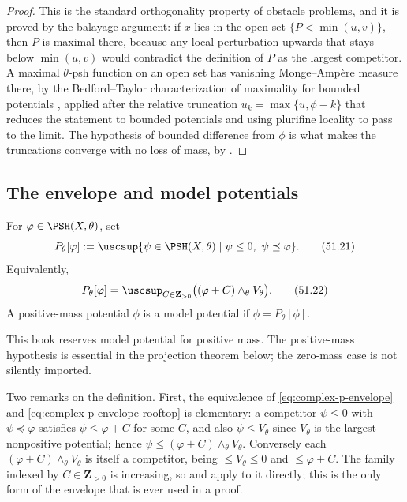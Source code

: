 \begin{proof}
This is the standard orthogonality property of obstacle problems, and it
is proved by the balayage argument: if \(x\) lies in the open set
\(\{P<\min(u,v)\}\), then \(P\) is maximal there, because any local
perturbation upwards that stays below \(\min(u,v)\) would contradict the
definition of \(P\) as the largest competitor.  A maximal
\(\theta\)-psh function on an open set has vanishing Monge--Amp\`ere
measure there, by the Bedford--Taylor characterization of maximality for
bounded potentials \cite{BT82}, applied after the relative truncation
\(u_k=\max\{u,\phi-k\}\) that reduces the statement to bounded
potentials and using plurifine locality to pass to the limit.  The
hypothesis of bounded difference from \(\phi\) is what makes the
truncations converge with no loss of mass, by
.
\end{proof}

\subsection{The envelope and model potentials}
\label{sec:ch51-p-envelope-def}

\begin{definition}
\label{def:complex-p-envelope}
For \(\varphi\in\PSH(X,\theta)\), set
\[
 P_\theta[\varphi]
 :=\uscsup\{\psi\in\PSH(X,\theta)\mid
              \psi\leq0,\ \psi\preceq\varphi\}.
\tag{51.21}\label{eq:complex-p-envelope}
\]
Equivalently,
\[
 P_\theta[\varphi]
 =\uscsup_{C\in\mathbf Z_{>0}}
       \bigl((\varphi+C)\wedge_\theta V_\theta\bigr).
\tag{51.22}\label{eq:complex-p-envelope-rooftop}
\]
A positive-mass potential \(\phi\) is a model potential if
\(\phi=P_\theta[\phi]\).
\end{definition}

This book reserves model potential for positive mass.  The
positive-mass hypothesis is essential in the projection theorem below;
the zero-mass case is not silently imported.

Two remarks on the definition.  First, the equivalence of
\eqref{eq:complex-p-envelope} and
\eqref{eq:complex-p-envelope-rooftop} is elementary: a competitor
\(\psi\leq0\) with \(\psi\preceq\varphi\) satisfies \(\psi\leq\varphi+C\)
for some \(C\), and also \(\psi\leq V_\theta\) since
\(V_\theta\) is the largest nonpositive potential; hence
\(\psi\leq(\varphi+C)\wedge_\theta V_\theta\).  Conversely each
\((\varphi+C)\wedge_\theta V_\theta\) is itself a competitor, being
\(\leq V_\theta\leq0\) and \(\leq\varphi+C\).  The family indexed by
\(C\in\mathbf Z_{>0}\) is increasing, so
 and
 apply to it directly; this is the only
form of the envelope that is ever used in a proof.

